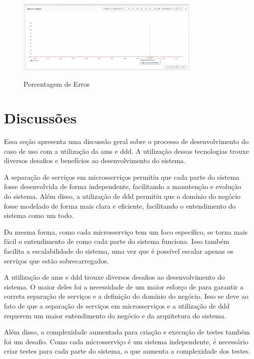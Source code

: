 \begin{figure}[H]
    \centering
    \caption{Porcentagem de Erros}
    \includegraphics[width=0.8\textwidth]{media/errors.png}
    \label{fig:error-rate}
\end{figure}

\section{Discussões}
Essa seção apresenta uma discussão geral sobre o processo de desenvolvimento do caso de uso com a utilização da \acrfull{ams} e \acrfull{ddd}. A utilização dessas tecnologias trouxe diversos desafios e benefícios ao desenvolvimento do sistema.

A separação de serviços em microsserviços permitiu que cada parte do sistema fosse desenvolvida de forma independente, facilitando a manutenção e evolução do sistema. Além disso, a utilização de \acrfull{ddd} permitiu que o domínio do negócio fosse modelado de forma mais clara e eficiente, facilitando o entendimento do sistema como um todo.

Da mesma forma, como cada microsserviço tem um foco específico, se torna mais fácil o entendimento de como cada parte do sistema funciona. Isso também facilita a escalabilidade do sistema, uma vez que é possível escalar apenas os serviços que estão sobrecarregados.

A utilização de \acrfull{ams} e \acrfull{ddd} trouxe diversos desafios ao desenvolvimento do sistema. O maior deles foi a necessidade de um maior esforço de  para garantir a correta separação de serviços e a definição do domínio do negócio. Isso se deve ao fato de que a separação de serviços em microsserviços e a utilização de \acrfull{ddd} requerem um maior entendimento do negócio e da arquitetura do sistema.

Além disso, a complexidade aumentada para criação e execução de testes também foi um desafio. Como cada microsserviço é um sistema independente, é necessário criar testes para cada parte do sistema, o que aumenta a complexidade dos testes.

